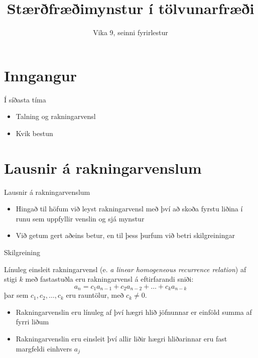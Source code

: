\documentclass[handout]{beamer}
\title{Stærðfræðimynstur í tölvunarfræði}
\subtitle{Vika 9, seinni fyrirlestur}
\begin{document}
\begin{frame}
\titlepage
\end{frame}


\section{Inngangur}

\begin{frame}{Í síðasta tíma}
\begin{itemize}
 \item Talning og rakningarvensl
 \item Kvik bestun
\end{itemize}
\end{frame}

\section{Lausnir á rakningarvenslum}

\begin{frame}{Lausnir á rakningarvenslum}
\begin{itemize}
 \item Hingað til höfum við leyst rakningarvensl með því að skoða fyrstu liðina í runu sem uppfyllir venslin og sjá mynstur
 \item Við getum gert aðeins betur, en til þess þurfum við betri skilgreiningar
\end{itemize}
\end{frame}

\begin{frame}{Skilgreining}
\begin{tcolorbox}[title=Línuleg einsleit rakningarvensl með fastastuðlum]
Línuleg einsleit rakningarvensl (e. \emph{a linear homogeneous recurrence relation}) af stigi $k$ með fastastuðla eru rakningarvensl á eftirfarandi sniði:
\[
 a_n = c_1 a_{n-1} + c_2a_{n-2} + \ldots + c_ka_{n-k}
\]
þar sem $c_1, c_2, \ldots, c_k$ eru rauntölur, með $c_k \neq 0$.
\end{tcolorbox}
\begin{itemize}
 \item Rakningarvenslin eru línuleg af því hægri hlið jöfnunnar er einföld summa af fyrri liðum
 \item Rakningarvenslin eru einsleit því allir liðir hægri hliðarinnar eru fast margfeldi einhvers $a_j$
\end{itemize}
\end{frame}
\end{document}
